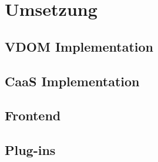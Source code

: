 \chapter{Umsetzung}

\section{\acs{VDOM} Implementation}


\section{\acl{CaaS} Implementation}


\section{Frontend}


\section{Plug-ins}

